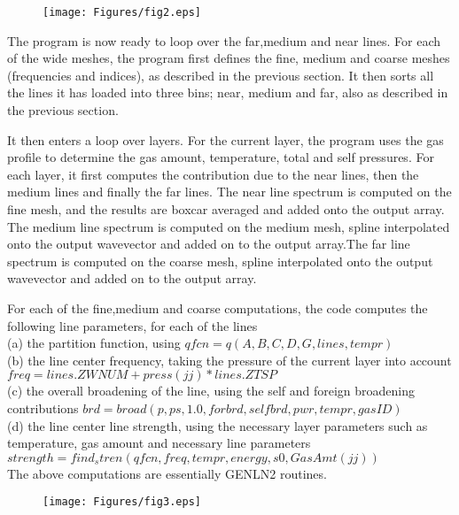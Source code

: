 \documentclass[11pt]{article}
\begin{document}
\begin{figure}[h]
  \begin{center}\texttt{[image: Figures/fig2.eps]}\end{center}
  \caption[Outline of initialization algorithm]{}
  \label{fig:init_alg}
\end{figure}

The program is now ready to loop over the far,medium and near lines. 
For each of the wide meshes, the program first defines the fine, medium and
coarse meshes (frequencies and indices), as described in the previous 
section. It then sorts all the lines it has loaded into three bins; near,
medium and far, also as described in the previous section.

It then enters a loop over layers. For the current layer, the program uses 
the gas profile to determine the gas amount, temperature, total and self 
pressures. For each layer, it first computes the contribution due to the 
near lines, then the medium lines and finally the far lines. The near line 
spectrum is computed
on the fine mesh, and the results are boxcar averaged and added onto the
output array. The medium line spectrum is computed on the medium mesh, 
spline interpolated onto the output wavevector and added on to the output 
array.The far line spectrum is computed on the coarse mesh, spline 
interpolated onto the output wavevector and added on to the output array.

For each of the fine,medium and coarse computations, the code computes
the following line parameters, for each of the lines\\
(a) the partition function, using $qfcn=q(A,B,C,D,G,lines,tempr)$\\
(b) the line center frequency, taking the pressure of the current layer into
    account $freq=lines.ZWNUM+press(jj)*lines.ZTSP$\\
(c) the overall broadening of the line, using the self and foreign 
    broadening
    contributions $brd=broad(p,ps,1.0,forbrd,selfbrd,pwr,tempr,gasID)$\\
(d) the line center line strength, using the necessary layer parameters 
    such as temperature, gas amount and necessary line parameters \\
    $strength=find_stren(qfcn,freq,tempr,energy,s0,GasAmt(jj))$\\
The above computations are essentially GENLN2 routines.

\begin{figure}[h]
  \begin{center}\texttt{[image: Figures/fig3.eps]}\end{center}
  \caption[Outline of loops over layers and fine,medium,coarse meshes]{}
  \label{fig:loop_alg}
\end{figure}
\end{document}
